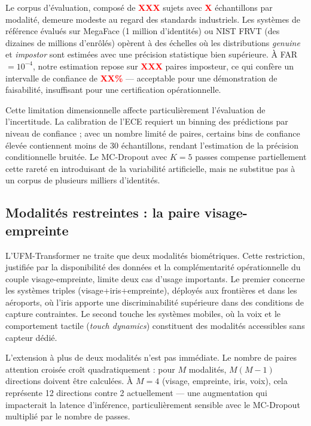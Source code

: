 \documentclass[12pt,a4paper]{report}
\begin{document}
Le corpus d'\'{e}valuation, compos\'{e} de \textcolor{red}{\textbf{XXX}} sujets avec \textcolor{red}{\textbf{X}} \'{e}chantillons par modalit\'{e}, demeure modeste au regard des standards industriels. Les syst\`{e}mes de r\'{e}f\'{e}rence \'{e}valu\'{e}s sur MegaFace \cite{kemelmacher2016megaface} (1 million d'identit\'{e}s) ou NIST FRVT \cite{nistfrvt} (des dizaines de millions d'enr\^{o}l\'{e}s) op\`{e}rent \`{a} des \'{e}chelles o\`{u} les distributions \emph{genuine} et \emph{impostor} sont estim\'{e}es avec une pr\'{e}cision statistique bien sup\'{e}rieure. \`{A} FAR $= 10^{-4}$, notre estimation repose sur \textcolor{red}{\textbf{XXX}} paires imposteur, ce qui conf\`{e}re un intervalle de confiance de \textcolor{red}{\textbf{XX\%}} --- acceptable pour une d\'{e}monstration de faisabilit\'{e}, insuffisant pour une certification op\'{e}rationnelle.

Cette limitation dimensionnelle affecte particuli\`{e}rement l'\'{e}valuation de l'incertitude. La calibration de l'ECE requiert un binning des pr\'{e}dictions par niveau de confiance ; avec un nombre limit\'{e} de paires, certains bins de confiance \'{e}lev\'{e}e contiennent moins de 30 \'{e}chantillons, rendant l'estimation de la pr\'{e}cision conditionnelle bruit\'{e}e. Le MC-Dropout avec $K=5$ passes compense partiellement cette raret\'{e} en introduisant de la variabilit\'{e} artificielle, mais ne substitue pas \`{a} un corpus de plusieurs milliers d'identit\'{e}s.

\subsection{Modalit\'{e}s restreintes : la paire visage-empreinte}

L'UFM-Transformer ne traite que deux modalit\'{e}s biom\'{e}triques. Cette restriction, justifi\'{e}e par la disponibilit\'{e} des donn\'{e}es et la compl\'{e}mentarit\'{e} op\'{e}rationnelle du couple visage-empreinte, limite deux cas d'usage importants. Le premier concerne les syst\`{e}mes triples (visage+iris+empreinte), d\'{e}ploy\'{e}s aux fronti\`{e}res et dans les a\'{e}roports, o\`{u} l'iris apporte une discriminabilit\'{e} sup\'{e}rieure dans des conditions de capture contraintes. Le second touche les syst\`{e}mes mobiles, o\`{u} la voix et le comportement tactile (\emph{touch dynamics}) constituent des modalit\'{e}s accessibles sans capteur d\'{e}di\'{e}.

L'extension \`{a} plus de deux modalit\'{e}s n'est pas imm\'{e}diate. Le nombre de paires attention crois\'{e}e cro\^{i}t quadratiquement : pour $M$ modalit\'{e}s, $M(M-1)$ directions doivent \^{e}tre calcul\'{e}es. \`{A} $M=4$ (visage, empreinte, iris, voix), cela repr\'{e}sente 12 directions contre 2 actuellement --- une augmentation qui impacterait la latence d'inf\'{e}rence, particuli\`{e}rement sensible avec le MC-Dropout multipli\'{e} par le nombre de passes.
\end{document}

